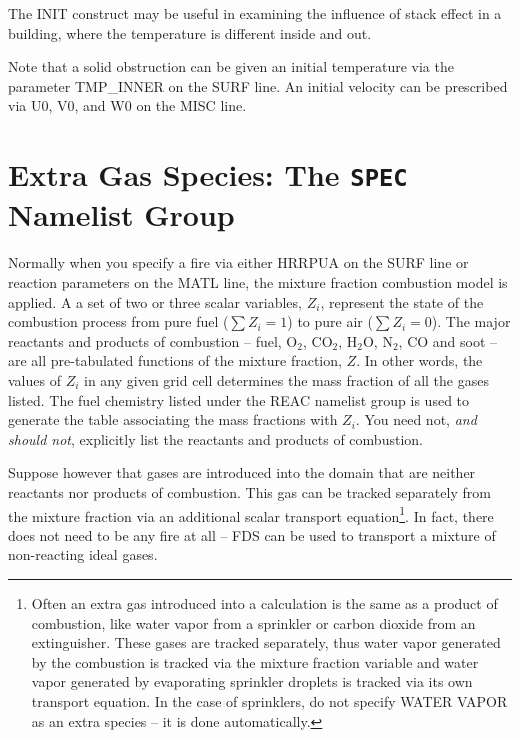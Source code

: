 \documentclass[11pt]{book}
\begin{document}
The {\ct INIT} construct may be useful in examining the influence of stack effect
in a building, where the temperature is different inside and out.

Note that a solid obstruction can be given an initial temperature via the
parameter {\ct TMP\_INNER} on the {\ct SURF} line. An initial velocity can be prescribed via
{\ct U0}, {\ct V0}, and {\ct W0} on the {\ct MISC} line.


\section{Extra Gas Species: The \texorpdfstring{{\tt SPEC}}{SPEC} Namelist Group}
\label{info:SPEC}

Normally when you specify a fire via either {\ct HRRPUA} on the {\ct SURF} line or
reaction parameters on the {\ct MATL} line, the mixture fraction combustion model
is applied. A a set of two or three scalar variables, $Z_i$, represent the state of
the combustion process from pure fuel ($\sum Z_i=1$) to pure air ($\sum Z_i=0$).
The major reactants and products of combustion -- fuel, O$_2$, CO$_2$,
H$_2$O, N$_2$, CO and soot -- are all pre-tabulated functions of
the mixture fraction, $Z$. In other words, the values of $Z_i$ in any
given grid cell determines the mass fraction of all the gases listed.
The fuel chemistry listed under the {\ct REAC} namelist
group is used to generate the table associating the mass fractions
with $Z_i$. You need not, {\em and should not},
explicitly list the reactants and products of combustion.

Suppose however that gases are introduced into the
domain that are neither reactants nor products of combustion.
This gas can be tracked separately from the mixture fraction via an additional scalar transport equation\footnote{
Often an extra gas introduced into a calculation is the same as a
product of combustion, like water vapor from a sprinkler or carbon
dioxide from an extinguisher. These gases are tracked separately,
thus water vapor generated by the combustion is tracked via the
mixture fraction variable and water vapor generated by evaporating
sprinkler droplets is tracked via its own transport equation. In the
case of sprinklers, do not specify {\ct WATER VAPOR} as
an extra species -- it is done automatically.}.
In fact, there does not need to be any fire
at all -- FDS can be used to transport a mixture of non-reacting
ideal gases.
\end{document}
